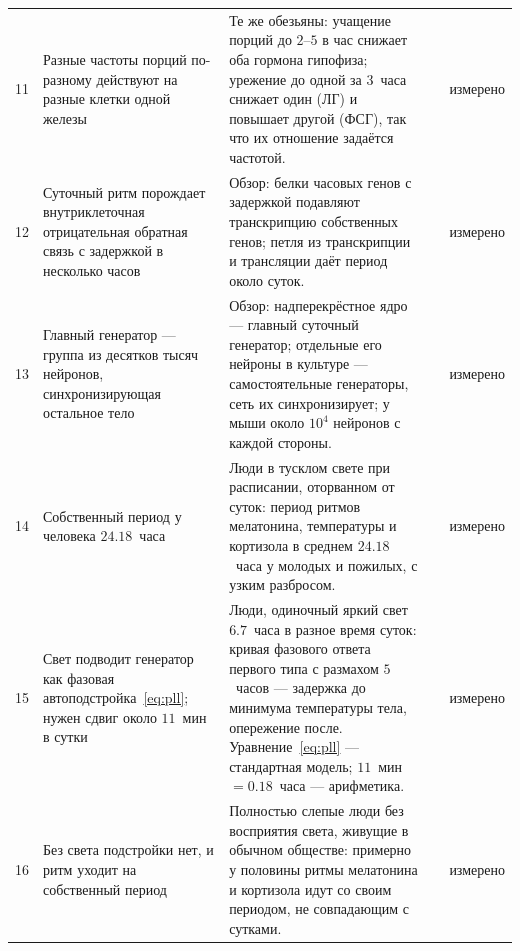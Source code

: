 {\begin{longtable}{>{\raggedright}p{0.5cm}>{\raggedright}p{4.0cm}>{\raggedright}p{5.6cm}>{\raggedright}p{2.3cm}>{\raggedright\arraybackslash}p{1.7cm}}
11 & Разные частоты порций по-разному действуют на разные клетки одной железы & Те же обезьяны: учащение порций до $2$--$5$ в час снижает оба гормона гипофиза; урежение до одной за $3$~часа снижает один (ЛГ) и повышает другой (ФСГ), так что их отношение задаётся частотой. & \cite{Wildt1981gnrh} & измерено \\
12 & Суточный ритм порождает внутриклеточная отрицательная обратная связь с задержкой в несколько часов & Обзор: белки часовых генов с задержкой подавляют транскрипцию собственных генов; петля из транскрипции и трансляции даёт период около суток. & \cite{TakahashiJS2017} & измерено \\
13 & Главный генератор --- группа из десятков тысяч нейронов, синхронизирующая остальное тело & Обзор: надперекрёстное ядро --- главный суточный генератор; отдельные его нейроны в культуре --- самостоятельные генераторы, сеть их синхронизирует; у мыши около $10^4$ нейронов с каждой стороны. & \cite{Welsh2010scn} & измерено \\
14 & Собственный период у человека $24.18$~часа & Люди в тусклом свете при расписании, оторванном от суток: период ритмов мелатонина, температуры и кортизола в среднем $24.18$~часа у молодых и пожилых, с узким разбросом. & \cite{Czeisler1999} & измерено \\
15 & Свет подводит генератор как фазовая автоподстройка~\eqref{eq:pll}; нужен сдвиг около $11$~мин в сутки & Люди, одиночный яркий свет $6.7$~часа в разное время суток: кривая фазового ответа первого типа с размахом $5$~часов --- задержка до минимума температуры тела, опережение после. Уравнение~\eqref{eq:pll} --- стандартная модель; $11$~мин $=0.18$~часа --- арифметика. & \cite{Khalsa2003prc} & измерено \\
16 & Без света подстройки нет, и ритм уходит на собственный период & Полностью слепые люди без восприятия света, живущие в обычном обществе: примерно у половины ритмы мелатонина и кортизола идут со своим периодом, не совпадающим с сутками. & \cite{Sack1992blind} & измерено \\
\bottomrule
\end{longtable}}
